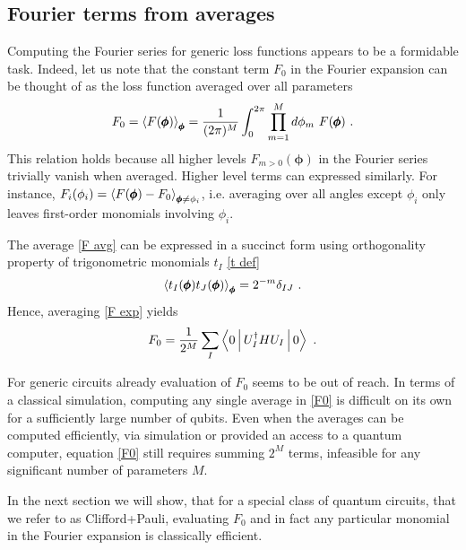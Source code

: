 \documentclass[twocolumn, amsfonts, amssymb, aps, nofootinbib]{revtex4-2}
\newcommand{\CP}{Clifford+Pauli}
\begin{document}
\subsection{Fourier terms from averages}
Computing the Fourier series for generic loss functions appears to be a formidable task. Indeed, let us note that the constant term $F_0$ in the Fourier expansion can be thought of as the loss function averaged over all parameters
\begin{align}
	F_0=\Braket{F(\pmb\phi)}_{\pmb\phi}=\frac{1}{(2\pi)^M}\int_0^{2\pi}\prod_{m=1}^Md\phi_m\,\, F(\pmb\phi) \ . \label{F avg}
\end{align}
This relation holds because all higher levels $F_{m>0}(\pmb\phi)$ in the Fourier series trivially vanish when averaged. Higher level terms can expressed similarly. For instance, $F_i(\phi_i)=\Braket{F(\pmb\phi)-F_0}_{\pmb\phi\neq\phi_i}$, i.e. averaging over all angles except $\phi_i$ only leaves first-order monomials involving $\phi_i$. 

The average \eqref{F avg} can be expressed in a succinct form using orthogonality property of trigonometric monomials $t_I$ \eqref{t def}  
\begin{align}
	\Braket{t_I(\pmb\phi) t_J(\pmb\phi)}_{\pmb\phi}=2^{-m}\delta_{IJ} \ . \label{t product}
\end{align}
Hence, averaging \eqref{F exp} yields
\begin{align}
	F_0=\frac{1}{2^M}\sum_{I}\Braket{0|U_I^\dagger H U_I|0} \ . \label{F0}
\end{align}

For generic circuits already evaluation of $F_0$ seems to be out of reach. In terms of a classical simulation, computing any single average in \eqref{F0} is difficult on its own for a sufficiently large number of qubits. Even when the averages can be computed efficiently, via simulation or provided an access to a quantum computer, equation \eqref{F0} still requires summing $2^M$ terms, infeasible for any significant number of parameters $M$.

In the next section we will show, that for a special class of quantum circuits, that we refer to as \CP{}, evaluating $F_0$ and in fact any particular monomial in the Fourier expansion is classically efficient. 
\end{document}
